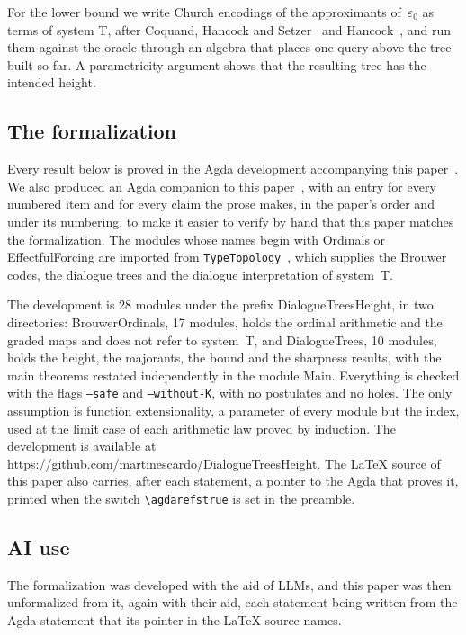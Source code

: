 \documentclass[11pt]{amsart}
\makeatletter
\newcommand{\eps}{\varepsilon_{0}}
\newcommand{\AgdaModule}[1]{{\footnotesize\color{agdablue}\textsf{#1}}}
\let\ttt@plain\texttt
\renewcommand{\texttt}[1]{{\footnotesize\color{agdablue}\ttt@plain{#1}}}
\theoremstyle{plain}
\theoremstyle{definition}
\makeatother
\begin{document}
For the lower bound we write Church encodings of the approximants
of~$\eps$ as terms of system T, after Coquand, Hancock and
Setzer~\cite{CoquandHancockSetzer1997} and Hancock~\cite{Hancock2008},
and run them against the
oracle through an algebra that places one query above the tree built
so far. A parametricity argument shows that the resulting tree has the
intended height.

\subsection*{The formalization}

Every result below is proved in the Agda development accompanying this
paper~\cite{Escardo2026Repository}. We also produced an Agda companion
to this paper~\cite{Escardo2026Companion}, with an entry for every
numbered item and for every claim the prose makes, in the paper's
order and under its numbering, to make it easier to verify by hand
that this paper matches the formalization. The modules whose names
begin with \AgdaModule{Ordinals} or \AgdaModule{EffectfulForcing} are
imported from \texttt{TypeTopology}~\cite{TypeTopology}, which
supplies the Brouwer codes, the dialogue trees and the dialogue
interpretation of system~T.

The development is 28 modules under the prefix
\AgdaModule{DialogueTreesHeight}, in two directories:
\AgdaModule{BrouwerOrdinals}, 17 modules, holds the ordinal arithmetic
and the graded maps and does not refer to system~T, and
\AgdaModule{DialogueTrees}, 10 modules, holds the height, the
majorants, the bound and the sharpness results, with the main theorems
restated independently in the module \AgdaModule{Main}. Everything is
checked with the flags \texttt{--safe} and \texttt{--without-K}, with
no postulates and no holes. The only assumption is function
extensionality, a parameter of every module but the index, used at the
limit case of each arithmetic law proved by induction. The development
is available at
\url{https://github.com/martinescardo/DialogueTreesHeight}. The
\LaTeX{} source of this paper also carries, after each statement, a
pointer to the Agda that proves it, printed when the switch
\texttt{\textbackslash agdarefstrue} is set in the preamble.

\subsection*{AI use}

The formalization was developed with the aid of LLMs, and this paper
was then unformalized from it, again with their aid, each statement
being written from the Agda statement that its pointer in the
\LaTeX{} source names.
\end{document}
